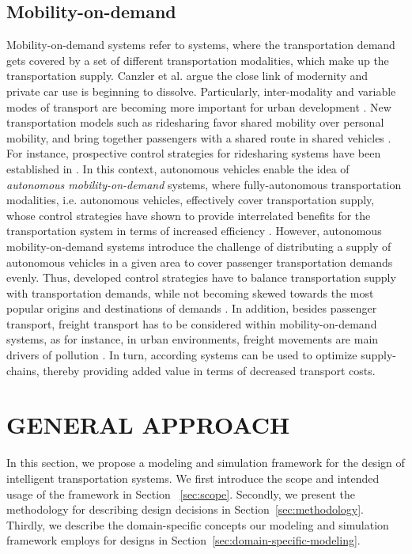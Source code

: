 \documentclass[a4paper,twoside]{article}
\begin{document}
	\subsection{Mobility-on-demand}
\label{sec:mobility-on-demand-systems}
	Mobility-on-demand systems refer to systems, where the transportation demand gets covered by a set of different transportation modalities, which make up the transportation supply.
	Canzler et al. \cite{canzler2016mobility} argue the close link of modernity and private car use is beginning to dissolve. Particularly, inter-modality and variable modes of transport are becoming more important for urban development \cite{rode2015towards}. New transportation models such as ridesharing favor shared mobility over personal mobility, and bring together passengers with a shared route in shared vehicles \cite{cohen2014ride}. For instance, prospective control strategies for ridesharing systems have been established in \cite{furuhata2013ridesharing,agatz2012optimization}.
	 In this context, autonomous vehicles enable the idea of \textit{autonomous mobility-on-demand} systems, where fully-autonomous transportation modalities, i.e. autonomous vehicles, effectively cover transportation supply, whose control strategies have shown to provide interrelated benefits for the transportation system in terms of increased efficiency \cite{fagnant2014travel}. However, autonomous mobility-on-demand systems introduce the challenge of distributing a supply of autonomous vehicles in a given area to cover passenger transportation demands evenly. Thus, developed control strategies have to balance transportation supply with transportation demands, while not becoming skewed towards the most popular origins and destinations of demands \cite{pavone2012robotic,zhang2016control}. In addition, besides passenger transport, freight transport has to be considered within mobility-on-demand systems, as for instance, in urban environments, freight movements are main drivers of pollution  \cite{amaral2015city}. In turn, according systems can be used to optimize supply-chains, thereby providing added value in terms of decreased transport costs. 
	
	\section{\uppercase{General approach}}
	\label{sec:approach}
	
	In this section, we propose a modeling and simulation framework for the design of intelligent transportation systems.
	We first introduce the scope and intended usage of the framework in Section ~\ref{sec:scope}.
	Secondly, we present the methodology for describing design decisions in Section~\ref{sec:methodology}.
	Thirdly, we describe the domain-specific concepts our modeling and simulation framework employs for designs in Section~\ref{sec:domain-specific-modeling}.
	
\end{document}
